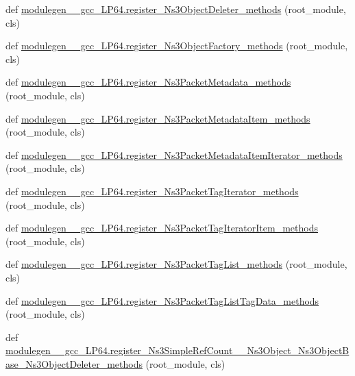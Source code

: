 \begin{DoxyCompactItemize}
\item 
def \hyperlink{namespacemodulegen____gcc__LP64_ae02c1fc1dc3e8ca9071dee347b82eae5}{modulegen\+\_\+\+\_\+gcc\+\_\+\+L\+P64.\+register\+\_\+\+Ns3\+Object\+Deleter\+\_\+methods} (root\+\_\+module, cls)
\item 
def \hyperlink{namespacemodulegen____gcc__LP64_a786202f6865813272a2645524e567a31}{modulegen\+\_\+\+\_\+gcc\+\_\+\+L\+P64.\+register\+\_\+\+Ns3\+Object\+Factory\+\_\+methods} (root\+\_\+module, cls)
\item 
def \hyperlink{namespacemodulegen____gcc__LP64_a1389373aaae60b11eca14fb1daaa350f}{modulegen\+\_\+\+\_\+gcc\+\_\+\+L\+P64.\+register\+\_\+\+Ns3\+Packet\+Metadata\+\_\+methods} (root\+\_\+module, cls)
\item 
def \hyperlink{namespacemodulegen____gcc__LP64_a2ac7c9819f0a71366e0cb996f16c2232}{modulegen\+\_\+\+\_\+gcc\+\_\+\+L\+P64.\+register\+\_\+\+Ns3\+Packet\+Metadata\+Item\+\_\+methods} (root\+\_\+module, cls)
\item 
def \hyperlink{namespacemodulegen____gcc__LP64_ad75a5ba1c89bf75f399491ebc4bc2299}{modulegen\+\_\+\+\_\+gcc\+\_\+\+L\+P64.\+register\+\_\+\+Ns3\+Packet\+Metadata\+Item\+Iterator\+\_\+methods} (root\+\_\+module, cls)
\item 
def \hyperlink{namespacemodulegen____gcc__LP64_a1d07a5663a331363a6765890f7c3f7ad}{modulegen\+\_\+\+\_\+gcc\+\_\+\+L\+P64.\+register\+\_\+\+Ns3\+Packet\+Tag\+Iterator\+\_\+methods} (root\+\_\+module, cls)
\item 
def \hyperlink{namespacemodulegen____gcc__LP64_af0346c019adfcbf415a97ec6cff465e1}{modulegen\+\_\+\+\_\+gcc\+\_\+\+L\+P64.\+register\+\_\+\+Ns3\+Packet\+Tag\+Iterator\+Item\+\_\+methods} (root\+\_\+module, cls)
\item 
def \hyperlink{namespacemodulegen____gcc__LP64_a96f93e9ac4cca72d9c82bad3ed221800}{modulegen\+\_\+\+\_\+gcc\+\_\+\+L\+P64.\+register\+\_\+\+Ns3\+Packet\+Tag\+List\+\_\+methods} (root\+\_\+module, cls)
\item 
def \hyperlink{namespacemodulegen____gcc__LP64_a5297a25e4d02fb34208dfd16709b500f}{modulegen\+\_\+\+\_\+gcc\+\_\+\+L\+P64.\+register\+\_\+\+Ns3\+Packet\+Tag\+List\+Tag\+Data\+\_\+methods} (root\+\_\+module, cls)
\item 
def \hyperlink{namespacemodulegen____gcc__LP64_a3df0bc75eda374a47e4888b021d60870}{modulegen\+\_\+\+\_\+gcc\+\_\+\+L\+P64.\+register\+\_\+\+Ns3\+Simple\+Ref\+Count\+\_\+\+\_\+\+Ns3\+Object\+\_\+\+Ns3\+Object\+Base\+\_\+\+Ns3\+Object\+Deleter\+\_\+methods} (root\+\_\+module, cls)
\item 

\end{DoxyCompactItemize}
